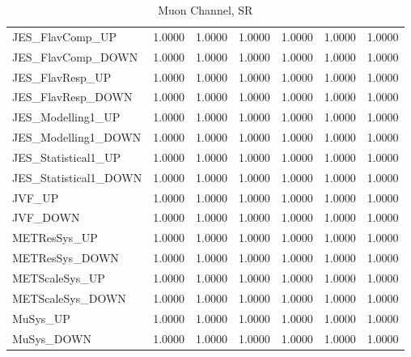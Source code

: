 \documentclass[11pt,oneside,a4paper]{article}
\begin{document}
\begin{table}
\begin{tabular}{lrrrrrr}
JES\_FlavComp\_UP & 1.0000 & 1.0000 & 1.0000 & 1.0000 & 1.0000 & 1.0000 \\
JES\_FlavComp\_DOWN & 1.0000 & 1.0000 & 1.0000 & 1.0000 & 1.0000 & 1.0000 \\
JES\_FlavResp\_UP & 1.0000 & 1.0000 & 1.0000 & 1.0000 & 1.0000 & 1.0000 \\
JES\_FlavResp\_DOWN & 1.0000 & 1.0000 & 1.0000 & 1.0000 & 1.0000 & 1.0000 \\
JES\_Modelling1\_UP & 1.0000 & 1.0000 & 1.0000 & 1.0000 & 1.0000 & 1.0000 \\
JES\_Modelling1\_DOWN & 1.0000 & 1.0000 & 1.0000 & 1.0000 & 1.0000 & 1.0000 \\
JES\_Statistical1\_UP & 1.0000 & 1.0000 & 1.0000 & 1.0000 & 1.0000 & 1.0000 \\
JES\_Statistical1\_DOWN & 1.0000 & 1.0000 & 1.0000 & 1.0000 & 1.0000 & 1.0000 \\
JVF\_UP & 1.0000 & 1.0000 & 1.0000 & 1.0000 & 1.0000 & 1.0000 \\
JVF\_DOWN & 1.0000 & 1.0000 & 1.0000 & 1.0000 & 1.0000 & 1.0000 \\
METResSys\_UP & 1.0000 & 1.0000 & 1.0000 & 1.0000 & 1.0000 & 1.0000 \\
METResSys\_DOWN & 1.0000 & 1.0000 & 1.0000 & 1.0000 & 1.0000 & 1.0000 \\
METScaleSys\_UP & 1.0000 & 1.0000 & 1.0000 & 1.0000 & 1.0000 & 1.0000 \\
METScaleSys\_DOWN & 1.0000 & 1.0000 & 1.0000 & 1.0000 & 1.0000 & 1.0000 \\
MuSys\_UP & 1.0000 & 1.0000 & 1.0000 & 1.0000 & 1.0000 & 1.0000 \\
MuSys\_DOWN & 1.0000 & 1.0000 & 1.0000 & 1.0000 & 1.0000 & 1.0000 \\
\end{tabular}
\caption{Muon Channel, SR}
\end{table}
\end{document}
